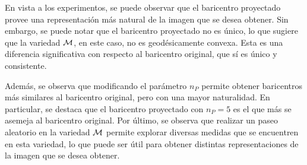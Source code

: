 En vista a los experimentos, se puede observar que el baricentro proyectado provee una representación más natural de la imagen que se desea obtener.
Sin embargo, se puede notar que el baricentro proyectado no es único, lo que sugiere que la variedad $\operatorname{\mathcal{M}}$, en este caso, no es geodésicamente convexa. Esta es una diferencia significativa con respecto al baricentro original, que sí es único y consistente.

Además, se observa que modificando el parámetro $n_P$ permite obtener baricentros más similares al baricentro original, pero con una mayor naturalidad. En particular, se destaca que el baricentro proyectado con $n_P=5$ es el que más se asemeja al baricentro original.
Por último, se observa que realizar un paseo aleatorio en la variedad $\operatorname{\mathcal{M}}$ permite explorar diversas medidas que se encuentren en esta variedad, lo que puede ser útil para obtener distintas representaciones de la imagen que se desea obtener.

